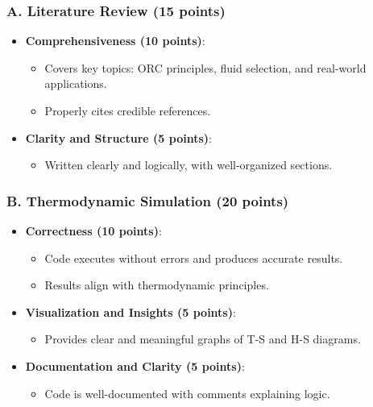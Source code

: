 \documentclass[11pt]{article}
\begin{document}
\subsubsection*{A. Literature Review (15 points)}
\begin{itemize}
    \item \textbf{Comprehensiveness (10 points)}:
    \begin{itemize}
        \item Covers key topics: ORC principles, fluid selection, and real-world applications.
        \item Properly cites credible references.
    \end{itemize}
    \item \textbf{Clarity and Structure (5 points)}:
    \begin{itemize}
        \item Written clearly and logically, with well-organized sections.
    \end{itemize}
\end{itemize}

\subsubsection*{B. Thermodynamic Simulation (20 points)}
\begin{itemize}
    \item \textbf{Correctness (10 points)}:
    \begin{itemize}
        \item Code executes without errors and produces accurate results.
        \item Results align with thermodynamic principles.
    \end{itemize}
    \item \textbf{Visualization and Insights (5 points)}:
    \begin{itemize}
        \item Provides clear and meaningful graphs of T-S and H-S diagrams.
    \end{itemize}
    \item \textbf{Documentation and Clarity (5 points)}:
    \begin{itemize}
        \item Code is well-documented with comments explaining logic.
    \end{itemize}
\end{itemize}
\end{document}

